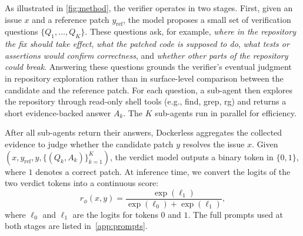 \documentclass[]{arxiv_template}
\newcommand{\approach}{Dockerless\xspace}
\newcommand{\zeng}[1]{\textcolor[rgb]{1,0.66,0}{\textbf{[Zeng: #1]}}}
\newcommand{\gu}[1]{\textcolor[rgb]{0,0.66,1}{\textbf{[Gu: #1]}}}
\begin{document}
As illustrated in \cref{fig:method}, the verifier operates in two stages.
First, given an issue \(x\) and a reference patch \(y_{\text{ref}}\), the model proposes a small set of verification questions $\{Q_1, \dots, Q_K\}$. These questions ask, for example, \textit{where in the repository the fix should take effect}, \textit{what the patched code is supposed to do}, \textit{ what tests or assertions would confirm correctness}, and \textit{whether other parts of the repository could break}.
Answering these questions grounds the verifier's eventual judgment in repository exploration rather than in surface-level comparison between the candidate and the reference patch.
For each question, a sub-agent then explores the repository through read-only shell tools (e.g., find, grep, rg) and returns a short evidence-backed answer $A_k$.
The $K$ sub-agents run in parallel for efficiency.

After all sub-agents return their answers, \approach aggregates the collected evidence to judge whether the candidate patch \(y\) resolves the issue \(x\).
Given \((x, y_{\text{ref}}, y, \{(Q_k, A_k)\}_{k=1}^{K})\), the verdict model outputs a binary token in \(\{0,1\}\), where \(1\) denotes a correct patch.
At inference time, we convert the logits of the two verdict tokens into a continuous score:
\[
  r_\phi(x, y) =
  \frac{\exp(\ell_1)}{\exp(\ell_0) + \exp(\ell_1)},
\]
where \(\ell_0\) and \(\ell_1\) are the logits for tokens \(0\) and \(1\).
The full prompts used at both stages are listed in~\cref{app:prompts}.


\end{document}
